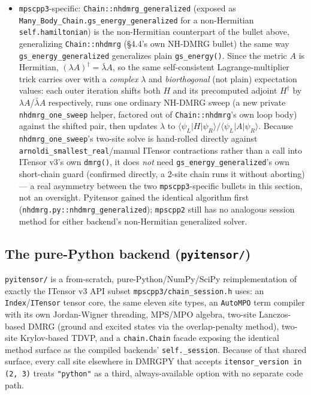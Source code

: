 \documentclass[11pt]{article}
\begin{document}
\begin{itemize}
    heads all three available routes (pyitensor, v3, and
    \texttt{algebra/arpacktk.py}'s pre-existing ARPACK-mode-2
    \texttt{mpsiram\_generalized}) up against each other on the same
    test problem --- v3 is consistently the fastest of the three at the
    (small) sizes benchmarked there.
\item \texttt{mpscpp3}-specific: \texttt{Chain::nhdmrg\_generalized}
    (exposed as \texttt{Many\_Body\_Chain.gs\_energy\_generalized} for a
    non-Hermitian \texttt{self.hamiltonian}) is the non-Hermitian
    counterpart of the bullet above, generalizing \texttt{Chain::nhdmrg}
    (\S4.4's own NH-DMRG bullet) the same way
    \texttt{gs\_energy\_generalized} generalizes plain
    \texttt{gs\_energy()}. Since the metric $A$ is Hermitian,
    $(\lambda A)^\dagger=\bar\lambda A$, so the same self-consistent
    Lagrange-multiplier trick carries over with a \emph{complex} $\lambda$
    and \emph{biorthogonal} (not plain) expectation values: each outer
    iteration shifts both $H$ and its precomputed adjoint $H^\dagger$ by
    $\lambda A$/$\bar\lambda A$ respectively, runs one ordinary NH-DMRG
    sweep (a new private \texttt{nhdmrg\_one\_sweep} helper, factored out
    of \texttt{Chain::nhdmrg}'s own loop body) against the shifted pair,
    then updates $\lambda$ to
    $\langle\psi_L|H|\psi_R\rangle/\langle\psi_L|A|\psi_R\rangle$.
    Because \texttt{nhdmrg\_one\_sweep}'s two-site solve is hand-rolled
    directly against \texttt{arnoldi\_smallest\_real}/manual ITensor
    contractions rather than a call into ITensor v3's own
    \texttt{dmrg()}, it does \emph{not} need
    \texttt{gs\_energy\_generalized}'s own short-chain guard (confirmed
    directly, a 2-site chain runs it without aborting) --- a real
    asymmetry between the two \texttt{mpscpp3}-specific bullets in this
    section, not an oversight. Pyitensor gained the identical algorithm
    first (\texttt{nhdmrg.py::nhdmrg\_generalized}); \texttt{mpscpp2}
    still has no analogous session method for either backend's
    non-Hermitian generalized solver.
\end{itemize}

\subsection{The pure-Python backend (\texttt{pyitensor/})}
\label{sec:pyitensor}

\texttt{pyitensor/} is a from-scratch, pure-Python/NumPy/SciPy
reimplementation of exactly the ITensor v3 API subset
\texttt{mpscpp3/chain\_session.h} uses: an \texttt{Index}/\texttt{ITensor}
tensor core, the same eleven site types, an \texttt{AutoMPO} term compiler
with its own Jordan-Wigner threading, MPS/MPO algebra, two-site
Lanczos-based DMRG (ground and excited states via the overlap-penalty
method), two-site Krylov-based TDVP, and a \texttt{chain.Chain} facade
exposing the identical method surface as the compiled backends'
\texttt{self.\_session}. Because of that shared surface, every call site
elsewhere in DMRGPY that accepts \texttt{itensor\_version in (2, 3)}
treats \texttt{"python"} as a third, always-available option with no
separate code path.
\end{document}
